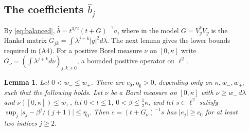 \documentclass[11pt]{article}
\newtheorem{lemma}[theorem]{Lemma}
\theoremstyle{definition}
\newcommand{\abs}[1]{\lvert #1\rvert}
\newcommand{\hb}{\hat b}
\begin{document}
\subsection{\texorpdfstring{The coefficients $\hb_j$}{The second coefficient sequence}}
By \eqref{eq:balanced}, $\hb=t^{3/2}(t+G)^{-1}a$, where in the model $G=V_y^*V_y$ is the Hankel
matrix $G_{jk}=\int\lambda^{j+k}\abs y^2d\lambda$. The next lemma gives the lower bounds
required in (A4). For a positive Borel measure $\nu$ on $[0,\kappa]$ write
$G_\nu=(\int\lambda^{j+k}d\nu)_{j,k\ge0}$, a bounded positive operator on $\ell^2$.

\begin{lemma}\label{lem:two}
Let $0<w_-\le w_+$. There are $c_0,\eta_0>0$, depending only on $\kappa,w_-,w_+$, such that
the following holds. Let $\nu$ be a Borel measure on $[0,\kappa]$ with
$\nu\ge w_-\,d\lambda$ and $\nu([0,\kappa])\le w_+$, let $0<t\le1$, $0<\beta\le\frac12\kappa$,
and let $s\in\ell^2$ satisfy $\sup_j\abs{s_j-\beta^j/(j+1)}\le\eta_0$. Then
$e=(t+G_\nu)^{-1}s$ has $\abs{e_j}\ge c_0$ for at least two indices $j\ge2$.
\end{lemma}
\end{document}

